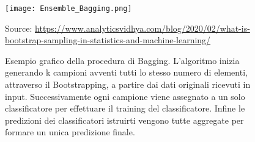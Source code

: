 \begin{figure}[h]
	\begin{center}
		\texttt{[image: Ensemble\_Bagging.png]}
		\caption{Esempio grafico della procedura di Bagging. L'algoritmo inizia generando k campioni avventi tutti lo stesso numero di elementi, attraverso il Bootstrapping, a partire dai dati originali ricevuti in input. Successivamente ogni campione viene assegnato a un solo classificatore per effettuare il \textsf{training} del classificatore. Infine le predizioni dei classificatori istruirti vengono tutte aggregate per formare un unica predizione finale. 
		} 
		Source: \url{https://www.analyticsvidhya.com/blog/2020/02/what-is-bootstrap-sampling-in-statistics-and-machine-learning/}\label{fig:bagging}
	\end{center}
\end{figure}

